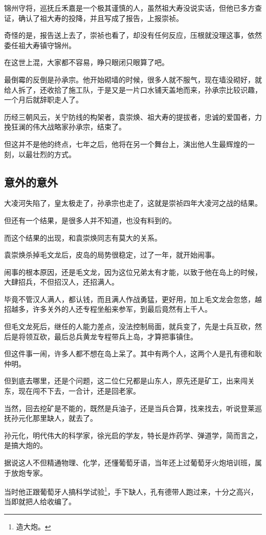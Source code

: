 \begin{multicols}{\theparacolNo}
锦州守将，巡抚丘禾嘉是一个极其谨慎的人，虽然祖大寿没说实话，但他已多方查证，确认了祖大寿的投降，并且写成了报告，上报崇祯。

奇怪的是，报告送上去了，崇祯也看了，却没有任何反应，压根就没理这事，依然委任祖大寿镇守锦州。

在这世上混，大家都不容易，睁只眼闭只眼算了吧。

最倒霉的反倒是孙承宗。他开始砌墙的时候，很多人就不服气，现在墙没砌好，就给人拆了，还收拾了施工队，于是又是一片口水铺天盖地而来，孙承宗比较识趣，一个月后就辞职走人了。

历经三朝风云，关宁防线的构架者，袁崇焕、祖大寿的提拔者，忠诚的爱国者，力挽狂澜的伟大战略家孙承宗，结束了。

但这并不是他的终点，七年之后，他将在另一个舞台上，演出他人生最辉煌的一刻，以最壮烈的方式。

\subsection{意外的意外}
大凌河失陷了，皇太极走了，孙承宗也走了，这就是崇祯四年大凌河之战的结果。

但还有一个结果，是很多人并不知道，也没有料到的。

而这个结果的出现，和袁崇焕同志有莫大的关系。

袁崇焕杀掉毛文龙后，皮岛的局势很稳定，过了一年，就开始闹事。

闹事的根本原因，还是毛文龙，因为这位兄弟太有才能，以致于他在岛上的时候，大肆招兵，不但招汉人，还招满人。

毕竟不管汉人满人，都认钱，而且满人作战勇猛，更好用，加上毛文龙会忽悠，越招越多，许多关外的人还专程坐船来参军，到最后竟然有上千人。

但毛文龙死后，继任的人能力差点，没法控制局面，就兵变了，先是士兵互砍，然后是将领互砍，最后总兵黄龙专程带兵上岛，才算把事镇住。

但这件事一闹，许多人都不想在岛上呆了。其中有两个人，这两个人是孔有德和耿仲明。

但到底去哪里，还是个问题，这二位仁兄都是山东人，原先还是矿工，出来闯关东，现在闯不下去，一合计，还是回老家。

当然，回去挖矿是不能的，既然是兵油子，还是当兵合算，找来找去，听说登莱巡抚孙元化那里缺人，就去了。

孙元化，明代伟大的科学家，徐光启的学友，特长是炸药学、弹道学，简而言之，是搞大炮的。

据说这人不但精通物理、化学，还懂葡萄牙语，当年还上过葡萄牙火炮培训班，属于放炮专家。

当时他正跟葡萄牙人搞科学试验\footnote{造大炮。}，手下缺人，孔有德带人跑过来，十分之高兴，当即就把人给收编了。


\end{multicols}
